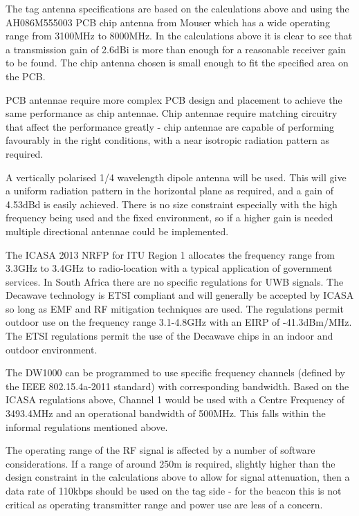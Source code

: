 The tag antenna specifications are based on the calculations above and using the AH086M555003 PCB chip antenna from Mouser which has a wide operating range from 3100MHz to 8000MHz. In the calculations above it is clear to see that a transmission gain of 2.6dBi is more than enough for a reasonable receiver gain to be found. The chip antenna chosen is small enough to fit the specified area on the PCB.

PCB antennae require more complex PCB design and placement to achieve the same performance as chip antennae. Chip antennae require matching circuitry that affect the performance greatly - chip antennae are capable of performing favourably in the right conditions, with a near isotropic radiation pattern as required.\cite{TI-Ant}

A vertically polarised 1/4 wavelength dipole antenna will be used. This will give a uniform radiation pattern in the horizontal plane as required, and a gain of 4.53dBd is easily achieved. There is no size constraint especially with the high frequency being used and the fixed environment, so if a higher gain is needed multiple directional antennae could be implemented.

The ICASA 2013 NRFP for ITU Region 1 allocates the frequency range from 3.3GHz to 3.4GHz to radio-location with a typical application of government services. In South Africa there are no specific regulations for UWB signals. The Decawave technology is ETSI compliant and will generally be accepted by ICASA so long as EMF and RF mitigation techniques are used. The regulations permit outdoor use on the frequency range 3.1-4.8GHz with an EIRP of -41.3dBm/MHz. The ETSI regulations permit the use of the Decawave chips in an indoor and outdoor environment.

The DW1000 can be programmed to use specific frequency channels (defined by the IEEE 802.15.4a-2011 standard) with corresponding bandwidth. Based on the ICASA regulations above, Channel 1 would be used with a Centre Frequency of 3493.4MHz and an operational bandwidth of 500MHz. This falls within the informal regulations mentioned above. 

The operating range of the RF signal is affected by a number of software considerations. If a range of around 250m is required, slightly higher than the design constraint in the calculations above to allow for signal attenuation, then a data rate of 110kbps should be used on the tag side - for the beacon this is not critical as operating transmitter range and power use are less of a concern.

